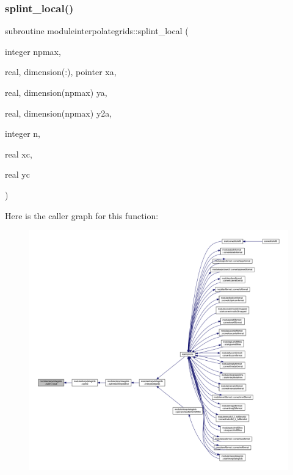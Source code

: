 \subsubsection{\texorpdfstring{splint\+\_\+local()}{splint\_local()}}
{\footnotesize\ttfamily subroutine moduleinterpolategrids\+::splint\+\_\+local (\begin{DoxyParamCaption}\item[{integer}]{npmax,  }\item[{real, dimension(\+:), pointer}]{xa,  }\item[{real, dimension(npmax)}]{ya,  }\item[{real, dimension(npmax)}]{y2a,  }\item[{integer}]{n,  }\item[{real}]{xc,  }\item[{real}]{yc }\end{DoxyParamCaption})\hspace{0.3cm}{\ttfamily [private]}}

Here is the caller graph for this function\+:\nopagebreak
\begin{figure}[H]
\begin{center}
\leavevmode
\includegraphics[width=350pt]{namespacemoduleinterpolategrids_a6c7fccee42f4e09612054b2280c92034_icgraph}
\end{center}
\end{figure}
\mbox{\label{namespacemoduleinterpolategrids_af563db97a33c679a4f2a61c77a82a50f}} 
